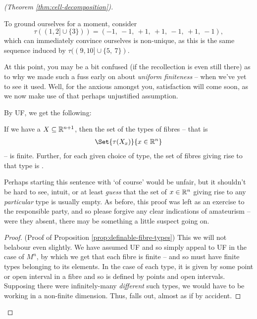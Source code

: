 \begin{proof}[\CD (Theorem \ref{thm:cell-decomposition})]
\begin{description}
  \end{description}

    To ground ourselves for a moment, consider $$\tau((1, 2] \cup \{ 3 \} )) = (-1,\ -1,\ +1,\ +1,\ -1,\ +1,\ -1),$$
    which can immediately convince ourselves is non-unique, as this is the same sequence induced by $\tau((9, 10] \cup \{5,\ 7\} )$.

    At this point, you may be a bit confused (if the recollection is even still there) as to why we made such a fuss early on about \emph{uniform finiteness} -- when we've yet to see it used. Well, for the anxious amongst you, satisfaction will come soon, as we now make use of that perhaps unjustified assumption.

    By UF, we get the following:
    \begin{proposition}
      If we have a  $X \subseteq \mathbb{R}^{n+1}$, then the set of the types of fibres -- that is
      \begin{align*}
        \Set{\tau(X_x)}{x \in \R^n}
      \end{align*}
      -- is finite. Further, for each given choice of type, the set of fibres giving rise to that type is .
      \label{prop:definable-fibre-types}
    \end{proposition}
    Perhaps starting this sentence with `of course' would be unfair, but it shouldn't be hard to see, intuit, or at least \emph{guess} that the set of $x \in \mathbb{R}^n$ giving rise to any \emph{particular} type is usually empty. As before, this proof was left as an exercise to the responsible party, and so please forgive any clear indications of amateurism -- were they absent, there may be something a little suspect going on.

    \begin{proof}(Proof of Proposition \ref{prop:definable-fibre-types})
      This we will not belabour even slightly. We have assumed UF and so simply appeal to UF in the case of $M^{n}$, by which we get that each fibre is finite -- and so must have finite types belonging to its elements. In the case of each type, it is given by some point or open interval in a fibre and so is defined by points and open intervals. Supposing there were infinitely-many \emph{different} such types, we would have to be working in a non-finite dimension. Thus,  falls out, almost as if by accident.
      \smartqed
    \end{proof}


\end{proof}
